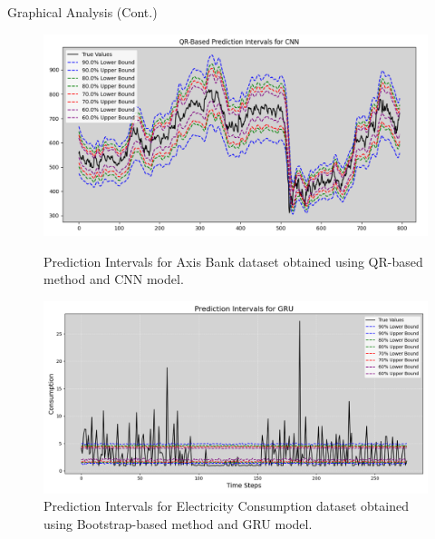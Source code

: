 \documentclass[xcolor=dvipsnames,aspectratio=169]{beamer}
\begin{document}
\begin{frame}{Graphical Analysis (Cont.)}

\begin{figure}
    \centering
    \begin{minipage}[b]{0.45\linewidth}
        \centering
        \includegraphics[width=\linewidth]{QR_CNN_AxisBank.png}
        \caption{Prediction Intervals for Axis Bank dataset obtained using QR-based method and CNN model.}
        \label{fig:asianpaints}
    \end{minipage}
    \hfill
    \begin{minipage}[b]{0.45\linewidth}
        \centering
        \includegraphics[width=\linewidth]{Prediction_Intervals_Styled_GRU_Electricity_Consumption.png}
        \caption{Prediction Intervals for Electricity Consumption dataset obtained using Bootstrap-based method and GRU model.}
        \label{fig:adaniports}
    \end{minipage}
\end{figure}

\end{frame}
\end{document}
